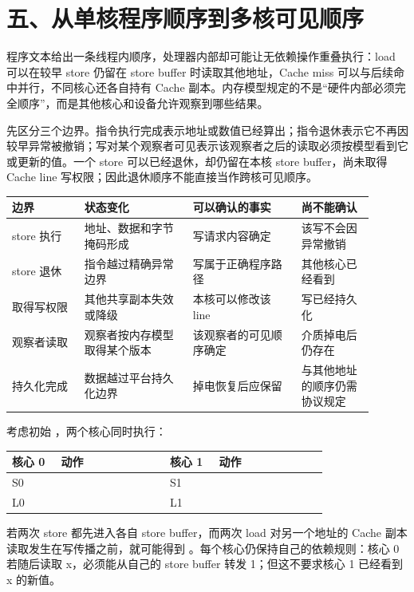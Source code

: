 \section{五、从单核程序顺序到多核可见顺序}

程序文本给出一条线程内顺序，处理器内部却可能让无依赖操作重叠执行：load 可以在较早 store 仍留在 store buffer 时读取其他地址，Cache miss 可以与后续命中并行，不同核心还各自持有 Cache 副本。内存模型规定的不是“硬件内部必须完全顺序”，而是其他核心和设备允许观察到哪些结果。

先区分三个边界。指令执行完成表示地址或数值已经算出；指令退休表示它不再因较早异常被撤销；写对某个观察者可见表示该观察者之后的读取必须按模型看到它或更新的值。一个 store 可以已经退休，却仍留在本核 store buffer，尚未取得 Cache line 写权限；因此退休顺序不能直接当作跨核可见顺序。

\begin{longtable}{L{0.18\linewidth}L{0.27\linewidth}L{0.27\linewidth}L{0.18\linewidth}}
\toprule
边界 & 状态变化 & 可以确认的事实 & 尚不能确认 \\
\midrule
store 执行 & 地址、数据和字节掩码形成 & 写请求内容确定 & 该写不会因异常撤销 \\\tablerowrule
store 退休 & 指令越过精确异常边界 & 写属于正确程序路径 & 其他核心已经看到 \\\tablerowrule
取得写权限 & 其他共享副本失效或降级 & 本核可以修改该 line & 写已经持久化 \\\tablerowrule
观察者读取 & 观察者按内存模型取得某个版本 & 该观察者的可见顺序确定 & 介质掉电后仍存在 \\\tablerowrule
持久化完成 & 数据越过平台持久化边界 & 掉电恢复后应保留 & 与其他地址的顺序仍需协议规定 \\
\bottomrule
\end{longtable}


考虑初始 ，两个核心同时执行：

\begin{longtable}{L{0.14\linewidth}L{0.31\linewidth}L{0.14\linewidth}L{0.31\linewidth}}
\toprule
核心 0 & 动作 & 核心 1 & 动作 \\
\midrule
S0 &  & S1 &  \\\tablerowrule
L0 &  & L1 &  \\
\bottomrule
\end{longtable}

若两次 store 都先进入各自 store buffer，而两次 load 对另一个地址的 Cache 副本读取发生在写传播之前，就可能得到 。每个核心仍保持自己的依赖规则：核心 0 若随后读取 x，必须能从自己的 store buffer 转发 1；但这不要求核心 1 已经看到 x 的新值。

